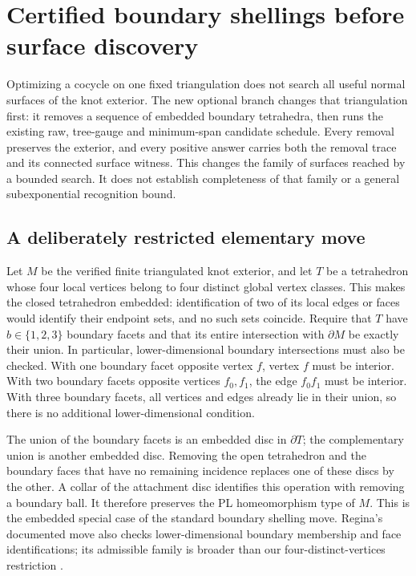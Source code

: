 \section{Certified boundary shellings before surface discovery}
\label{sec:boundary-shellings}

Optimizing a cocycle on one fixed triangulation does not search all useful
normal surfaces of the knot exterior. The new optional branch changes that
triangulation first: it removes a sequence of embedded boundary tetrahedra,
then runs the existing raw, tree-gauge and minimum-span candidate schedule.
Every removal preserves the exterior, and every positive answer carries both
the removal trace and its connected surface witness. This changes the family
of surfaces reached by a bounded search. It does not establish completeness
of that family or a general subexponential recognition bound.

\subsection{A deliberately restricted elementary move}

Let $M$ be the verified finite triangulated knot exterior, and let $T$ be a
tetrahedron whose four local vertices belong to four distinct global vertex
classes. This makes the closed tetrahedron embedded: identification of two
of its local edges or faces would identify their endpoint sets, and no such
sets coincide. Require that $T$ have $b\in\{1,2,3\}$ boundary facets and that
its entire intersection with $\partial M$ be exactly their union. In
particular, lower-dimensional boundary intersections must also be checked.
With one boundary facet opposite vertex $f$, vertex $f$ must be interior.
With two boundary facets opposite vertices $f_0,f_1$, the edge $f_0f_1$ must
be interior. With three boundary facets, all vertices and edges already lie
in their union, so there is no additional lower-dimensional condition.

The union of the boundary facets is an embedded disc in $\partial T$; the
complementary union is another embedded disc. Removing the open tetrahedron
and the boundary faces that have no remaining incidence replaces one of these
discs by the other. A collar of the attachment disc identifies this operation
with removing a boundary ball. It therefore preserves the PL homeomorphism
type of $M$. This is the embedded special case of the standard boundary
shelling move. Regina's documented move also checks lower-dimensional
boundary membership and face identifications; its admissible family is
broader than our four-distinct-vertices restriction
\cite{regina-boundary-shelling}.

